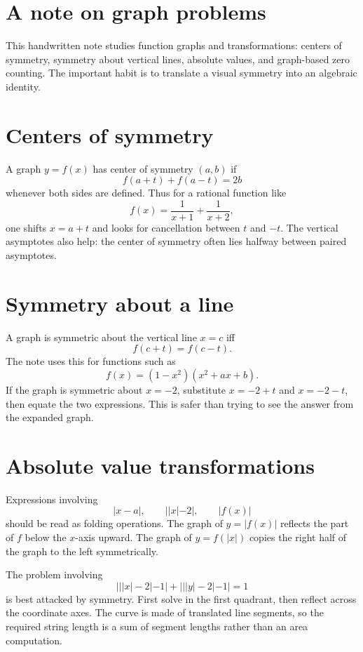 
\section{A note on graph problems}

This handwritten note studies function graphs and transformations: centers of symmetry, symmetry about vertical lines, absolute values, and graph-based zero counting.  The important habit is to translate a visual symmetry into an algebraic identity.

\section{Centers of symmetry}

A graph \(y=f(x)\) has center of symmetry \((a,b)\) if
\[
  f(a+t)+f(a-t)=2b
\]
whenever both sides are defined.  Thus for a rational function like
\[
  f(x)=\frac{1}{x+1}+\frac{1}{x+2},
\]
one shifts \(x=a+t\) and looks for cancellation between \(t\) and \(-t\).  The vertical asymptotes also help: the center of symmetry often lies halfway between paired asymptotes.

\section{Symmetry about a line}

A graph is symmetric about the vertical line \(x=c\) iff
\[
  f(c+t)=f(c-t).
\]
The note uses this for functions such as
\[
  f(x)=(1-x^2)(x^2+ax+b).
\]
If the graph is symmetric about \(x=-2\), substitute \(x=-2+t\) and \(x=-2-t\), then equate the two expressions.  This is safer than trying to see the answer from the expanded graph.

\section{Absolute value transformations}

Expressions involving
\[
  |x-a|,\qquad ||x|-2|,\qquad |f(x)|
\]
should be read as folding operations.  The graph of \(y=|f(x)|\) reflects the part of \(f\) below the \(x\)-axis upward.  The graph of \(y=f(|x|)\) copies the right half of the graph to the left symmetrically.

The problem involving
\[
  |||x|-2|-1|+|||y|-2|-1|=1
\]
is best attacked by symmetry.  First solve in the first quadrant, then reflect across the coordinate axes.  The curve is made of translated line segments, so the required string length is a sum of segment lengths rather than an area computation.

